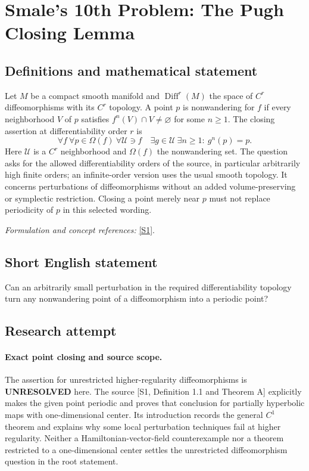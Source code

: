 \documentclass[11pt]{article}
\begin{document}
\section*{\texorpdfstring{Smale's 10th Problem: The Pugh Closing Lemma}{Smale's 10th Problem: The Pugh Closing Lemma}}\label{statement}
\subsection{Definitions and mathematical statement}
Let $M$ be a compact smooth manifold and $\operatorname{Diff}^r(M)$ the space of $C^r$ diffeomorphisms with its $C^r$ topology. A point $p$ is nonwandering for $f$ if every neighborhood $V$ of $p$ satisfies $f^n(V)\cap V\ne\varnothing$ for some $n\ge1$. The closing assertion at differentiability order $r$ is
\[
 \forall f\ \forall p\in\Omega(f)\ \forall\mathcal U\ni f
 \quad\exists g\in\mathcal U\ \exists n\ge1:\ g^n(p)=p.
\]
Here $\mathcal U$ is a $C^r$ neighborhood and $\Omega(f)$ the nonwandering set. The question asks for the allowed differentiability orders of the source, in particular arbitrarily high finite orders; an infinite-order version uses the usual smooth topology. It concerns perturbations of diffeomorphisms without an added volume-preserving or symplectic restriction. Closing a point merely near $p$ must not replace periodicity of $p$ in this selected wording.
\par\smallskip\textit{Formulation and concept references:} \href{https://arxiv.org/html/2004.06855v2}{[S1]}.

\subsection{Short English statement}
Can an arbitrarily small perturbation in the required differentiability topology turn any nonwandering point of a diffeomorphism into a periodic point?
\subsection{Research attempt}
\paragraph{Exact point closing and source scope.}
The assertion for unrestricted higher-regularity diffeomorphisms
is \textbf{UNRESOLVED} here. The source [S1, Definition 1.1 and
Theorem A] explicitly makes the given point periodic and proves
that conclusion for partially hyperbolic maps with one-dimensional
center. Its introduction records the general $C^1$ theorem and
explains why some local perturbation techniques fail at higher
regularity. Neither a Hamiltonian-vector-field counterexample nor
a theorem restricted to a one-dimensional center settles the
unrestricted diffeomorphism question in the root statement.
\end{document}
